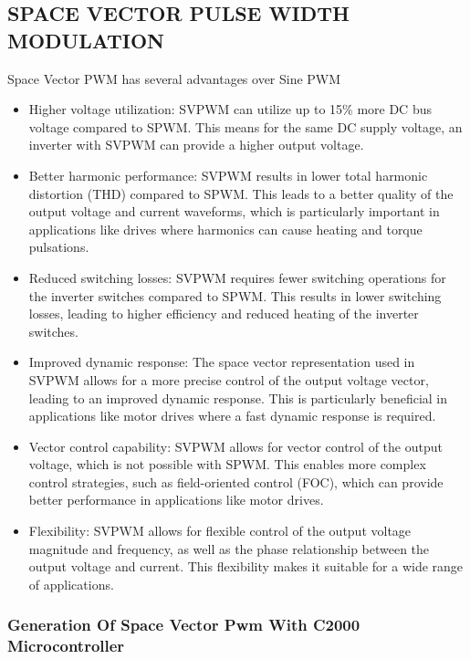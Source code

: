 \subsection{SPACE VECTOR PULSE WIDTH MODULATION}

Space Vector PWM has several advantages over Sine PWM

\begin{itemize}
	\item Higher voltage utilization: SVPWM can utilize up to 15\% more DC bus voltage compared to SPWM. This means for the same DC supply voltage, an inverter with SVPWM can provide a higher output voltage.

	\item Better harmonic performance: SVPWM results in lower total harmonic distortion (THD) compared to SPWM. This leads to a better quality of the output voltage and current waveforms, which is particularly important in applications like drives where harmonics can cause heating and torque pulsations.

	\item Reduced switching losses: SVPWM requires fewer switching operations for the inverter switches compared to SPWM. This results in lower switching losses, leading to higher efficiency and reduced heating of the inverter switches.

	\item Improved dynamic response: The space vector representation used in SVPWM allows for a more precise control of the output voltage vector, leading to an improved dynamic response. This is particularly beneficial in applications like motor drives where a fast dynamic response is required.

	\item Vector control capability: SVPWM allows for vector control of the output voltage, which is not possible with SPWM. This enables more complex control strategies, such as field-oriented control (FOC), which can provide better performance in applications like motor drives.

	\item Flexibility: SVPWM allows for flexible control of the output voltage magnitude and frequency, as well as the phase relationship between the output voltage and current. This flexibility makes it suitable for a wide range of applications.
\end{itemize}

\subsubsection{Generation Of Space Vector Pwm With C2000 Microcontroller}

